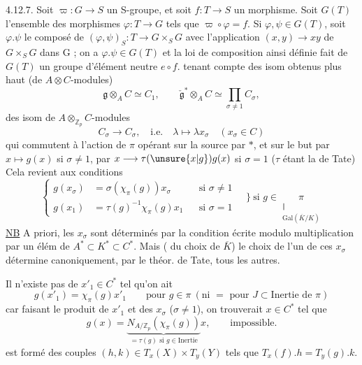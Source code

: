 4.12.7. Soit $\varpi:G\longrightarrow S$ un S-groupe, et soit $f:T\longrightarrow S$ un morphisme. Soit $G(T)$ l'ensemble des morphismes $\varphi:T\longrightarrow G$ tels que $\varpi\circ\varphi=f$. Si $\varphi,\psi\in G(T)$, soit $\varphi.\psi$ le composé de $(\varphi,\psi)_S:T\longrightarrow G\times_S G$ avec l'application $(x,y)\longrightarrow xy$ de $G\times_S G$ dans G ; on a $\varphi.\psi\in G(T)$ et la loi de composition ainsi définie fait de $G(T)$ un groupe d'élément neutre $e\circ f$.
tenant compte des isom  obtenus plus haut (de $A\otimes C$-modules)
\[
\mathfrak g\otimes_A C\simeq C_1,\qquad\check{\mathfrak g}^{*}\otimes_A C\simeq\prod_{\sigma\ne1}C_\sigma,
\]
  des isom de $A\otimes_{\mathbb Z_p}C$-modules
\[
C_\sigma\longrightarrow C_\sigma,\quad\text{i.e.}\quad\lambda\longmapsto\lambda x_\sigma\quad(x_\sigma\in C)
\]
qui commutent à l'action de $\pi$ opérant sur la source par $*$, et sur le but par  $x\longmapsto g(x)$ si $\sigma\ne1$, par $x\longrightarrow\tau(\unsure{x|g})g(x)$ si $\sigma=1$ ($\tau$ étant la  de Tate) Cela revient aux conditions
\[
\boxed{\left\{\begin{aligned}
g(x_\sigma)&=\sigma(\chi_\pi(g))x_\sigma&&\text{si }\sigma\ne1\\
g(x_1)&=\tau(g)^{-1}\chi_\pi(g)x_1&&\text{si }\sigma=1
\end{aligned}\right.\quad\Biggr\}\ \text{si }g\in\underset{\substack{\Vert\\\mathrm{Gal}(\overline K/K)}}{\pi}}
\]
\uline{NB} A priori, les $x_\sigma$ sont déterminés par la condition écrite modulo multiplication par un élém de $A^*\subset K^*\subset C^*$. Mais  ( du choix de $\overline K$) le choix de l'un de ces $x_\sigma$  détermine canoniquement, par le théor. de Tate, tous les autres. 

Il n'existe pas de $x'_1\in C^*$ tel qu'on ait
\[
g(x'_1)=\chi_\pi(g)x'_1\qquad\text{pour }g\in\pi\ (\text{ni }=\text{ pour }J\subset\text{Inertie de }\pi)
\]
car faisant le produit de $x'_1$ et des $x_\sigma$ ($\sigma\ne1$), on trouverait $x\in C^*$ tel que
\[
g(x)=\underbrace{N_{A/\mathbb Z_p}(\chi_\pi(g))}_{=\tau(g)\text{ si }g\in\text{Inertie}}x,\qquad\text{impossible.}
\]
est formé des couples $(h,k)\in T_x(X)\times T_y(Y)$ tels que $T_x(f).h=T_y(g).k$.


